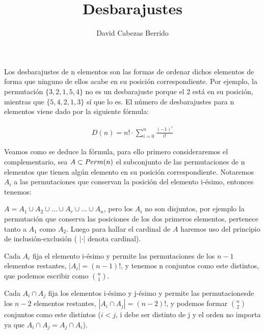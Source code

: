 \documentclass[12pt,spanish]{article}
\title{Desbarajustes}
\author{David Cabezas Berrido}
\date{}
\theoremstyle{definition}
\theoremstyle{remark}
\begin{document}
\maketitle

\begin{justify}
  Los desbarajustes de n elementos son las formas de ordenar dichos
  elementos de forma que ninguno de ellos acabe en su posición
  correspondiente. Por ejemplo, la permutación $\{3,2,1,5,4\}$ no es
  un desbarajuste porque el 2 está en su posición, mientras que
  $\{5,4,2,1,3\}$ sí que lo es.  El número de desbarajustes para n
  elementos viene dado por la siguiente fórmula:
\end{justify}

\begin{align*}
  D(n)=n!\cdot\sum\limits_{i=0}^n\frac{(-1)^i}{i!}
\end{align*}

\begin{justify}
  Veamos como se deduce la fórmula, para ello primero consideraremos
  el complementario, sea $A\subset\mathnormal{Perm}(n)$ el subconjunto
  de las permutaciones de n elementos que tienen algún elemento en su
  posición correspondiente. Notaremos $A_i$ a las permutaciones que
  conservan la posición del elemento i-ésimo, entonces tenemos:
  
  $A=A_1\cup A_2\cup\ldots\cup A_r \cup\ldots\cup A_n$,
  pero los $A_i$
  no son disjuntos, por ejemplo la permutación que conserva las
  posiciones de los dos primeros elementos, pertenece tanto a $A_1$
  como $A_2$. Luego para hallar el cardinal de $A$ haremos uso del
  principio de inclusión-exclusión ( $|\cdot|$ denota cardinal).
\end{justify}

\begin{justify}
  Cada $A_i$ fija el elemento i-ésimo y permite las permutaciones de
  los $n-1$ elementos restantes, $|A_i|=(n-1)!$, y tenemos n conjuntos
  como este distintos, que podemos escribir como $\binom{n}{1}$.
\end{justify}

\begin{justify}
  Cada $A_i\cap A_j$ fija los elementos i-ésimo y j-ésimo y permite
  las permutacionesde los $n-2$ elementos restantes, $|A_i\cap
  A_j|=(n-2)!$, y podemos formar $\binom{n}{2}$ conjuntos como este
  distintos ($i<j$, i debe ser distinto de j y el orden no importa ya
  que $A_i\cap A_j =A_j\cap A_i$).
\end{justify}
\end{document}
